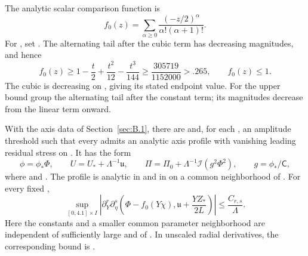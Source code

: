 The analytic scalar comparison function is
\begin{equation*}
  f_0(z)=\sum_{\alpha\geq0}\frac{(-z/2)^\alpha}{\alpha!(\alpha+1)!}.
\end{equation*}
For , set . The alternating tail
after the cubic term has decreasing magnitudes, and hence
\begin{equation}
  f_0(z)\geq1-\frac t2+\frac{t^2}{12}-\frac{t^3}{144}
  \geq\frac{305719}{1152000}>.265,
  \qquad f_0(z)\leq1.
  \tag{B.11}\label{eq:B.11}
\end{equation}
The cubic is decreasing on , giving its stated endpoint value. For
the upper bound group the alternating tail after the constant term; its magnitudes decrease from
the linear term onward.

\begin{proposition}\label{prop:B.2}
With the axis data of Section~\ref{sec:B.1}, there are  and, for
each , an amplitude threshold
 such that every
 admits an analytic axis profile with vanishing leading
residual stress on . It has the form
\begin{equation}
  \phi=\phi_*\Phi,
  \qquad U=U_*+\Lambda^{-1}\mathfrak u,
  \qquad \Pi=\Pi_0+\Lambda^{-1}\mathcal I(g^2\Phi^2),
  \qquad g=\phi_*/\mathsf C,
  \tag{B.12}\label{eq:B.12}
\end{equation}
%
where  and . The profile
is analytic in  and in  on a common
neighborhood of . For every fixed
,
\begin{equation}
  \sup_{[0,4.1]\times I}
  \left|\partial_Y^r\partial_\eta^s
    \left(\Phi-f_0(Y\chi),\mathfrak u+\frac{YZ_*}{2L}\right)\right|
  \leq\frac{C_{r,s}}{\Lambda}.
  \tag{B.13}\label{eq:B.13}
\end{equation}
Here the constants and a smaller common parameter neighborhood are independent of sufficiently
large  and of . In unscaled
radial derivatives, the corresponding bound is .
\end{proposition}


